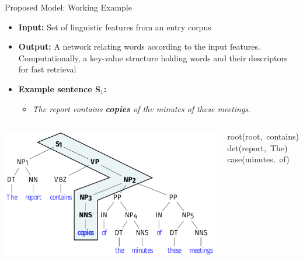 \documentclass[10pt,xcolor=table]{beamer}
\begin{document}
\begin{frame}{Proposed Model: Working Example}
\begin{itemize}
	\item \large \textbf{Input:} Set of linguistic features from an entry corpus
	\item \textbf{Output:} A network relating words according to the input features. Computationally, a key-value structure holding words and their descriptors for fast retrieval
	\item   \textbf{Example sentence \textbf{S$_1$}:}
		\begin{itemize}
			\item[]  \textit{The report contains \textbf{copies} of the minutes of these meetings}. 
		\end{itemize}
	
	 
\end{itemize}

\begin{columns}
	\begin{minipage}[c][0.4\textheight][c]{\linewidth}
	\centering
	\includegraphics[width=.8\linewidth]{img/tree.pdf}
	\end{minipage}
	\begin{minipage}[c][0.4\textheight][c]{\linewidth}
	\color{black!40}root(root,~contains) \\
	\color{black!40}det(report,~The) \\
	\color{black!40}case(minutes,~of)
	\end{minipage}
\end{columns}

\end{frame}
\end{document}
